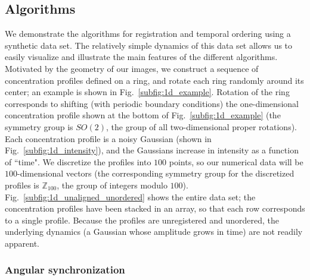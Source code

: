 \documentclass[10pt,twocolumn]{article}
\newcommand{\fig}[0]{Fig.}
\begin{document}
\subsection*{Algorithms}

We demonstrate the algorithms for registration and temporal ordering using a synthetic data set.
%
The relatively simple dynamics of this data set allows us to easily visualize and illustrate the main features of the different algorithms.
%
Motivated by the geometry of our images, we construct a sequence of concentration profiles defined on a ring, and rotate each ring randomly around its center; an example is shown in \fig~\ref{subfig:1d_example}.
%
Rotation of the ring corresponds to shifting (with periodic boundary conditions) the one-dimensional concentration profile shown at the bottom of \fig~\ref{subfig:1d_example} (the symmetry group is $SO(2)$, the group of all two-dimensional proper rotations).
%
Each concentration profile is a noisy Gaussian (shown in \fig~\ref{subfig:1d_intensity}), and the Gaussians increase in intensity as a function of ``time".
%
We discretize the profiles into $100$ points, so our numerical data will be $100$-dimensional vectors (the corresponding symmetry group for the discretized profiles is $\mathbb{Z}_{100}$, the group of integers modulo $100$).
%
\fig~\ref{subfig:1d_unaligned_unordered} shows the entire data set; the concentration profiles have been stacked in an array, so that each row corresponds to a single profile.
%
Because the profiles are unregistered and unordered, the underlying dynamics (a Gaussian whose amplitude grows in time) are not readily apparent.



\subsubsection*{Angular synchronization \citep{singer2011angular}}
\end{document}
